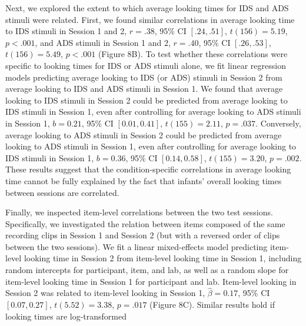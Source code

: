 \documentclass[
  man, donotrepeattitle,floatsintext]{apa6}
\begin{document}
Next, we explored the extent to which average looking times for IDS and ADS stimuli were related.
First, we found similar correlations in average looking time to IDS stimuli in Session 1 and 2, \(r = .38\), 95\% CI \([.24, .51]\), \(t(156) = 5.19\), \(p < .001\), and ADS stimuli in Session 1 and 2, \(r = .40\), 95\% CI \([.26, .53]\), \(t(156) = 5.49\), \(p < .001\) (Figure 8B).
To test whether these correlations were specific to looking times for IDS or ADS stimuli alone, we fit linear regression models predicting average looking to IDS (or ADS) stimuli in Session 2 from average looking to IDS and ADS stimuli in Session 1.
We found that average looking to IDS stimuli in Session 2 could be predicted from average looking to IDS stimuli in Session 1, even after controlling for average looking to ADS stimuli in Session 1, \(b = 0.21\), 95\% CI \([0.01, 0.41]\), \(t(155) = 2.11\), \(p = .037\).
Conversely, average looking to ADS stimuli in Session 2 could be predicted from average looking to ADS stimuli in Session 1, even after controlling for average looking to IDS stimuli in Session 1, \(b = 0.36\), 95\% CI \([0.14, 0.58]\), \(t(155) = 3.20\), \(p = .002\).
These results suggest that the condition-specific correlations in average looking time cannot be fully explained by the fact that infants' overall looking times between sessions are correlated.

Finally, we inspected item-level correlations between the two test sessions.
Specifically, we investigated the relation between items composed of the same recording clips in Session 1 and Session 2 (but with a reversed order of clips between the two sessions).
We fit a linear mixed-effects model predicting item-level looking time in Session 2 from item-level looking time in Session 1, including random intercepts for participant, item, and lab, as well as a random slope for item-level looking time in Session 1 for participant and lab.
Item-level looking in Session 2 was related to item-level looking in Session 1, \(\hat{\beta} = 0.17\), 95\% CI \([0.07, 0.27]\), \(t(5.52) = 3.38\), \(p = .017\) (Figure 8C).
Similar results hold if looking times are log-transformed
\end{document}
